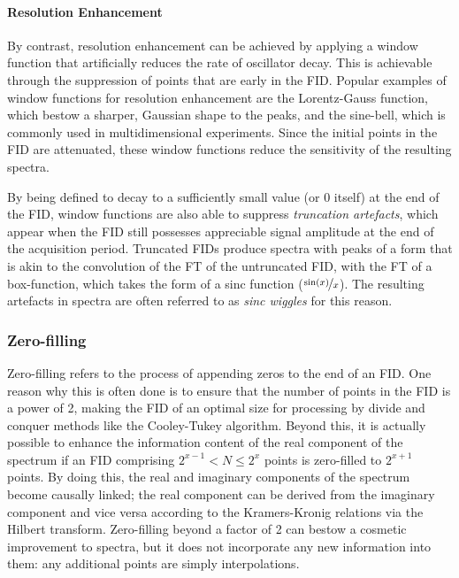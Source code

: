 \paragraph{Resolution Enhancement} By contrast, resolution enhancement can be
achieved by applying a window function that artificially reduces the rate of
oscillator decay. This is achievable through the suppression of points that are
early in the \ac{FID}. Popular
examples of window functions for resolution enhancement are the Lorentz-Gauss
function, which bestow a sharper, Gaussian shape to the peaks, and the
sine-bell, which is commonly used in multidimensional experiments. Since the
initial points in the \ac{FID} are attenuated, these window functions reduce the
sensitivity of the resulting spectra.

By being defined to decay to a sufficiently small value (or $0$ itself) at the
end of
the \ac{FID}, window functions are also able to suppress \emph{truncation
artefacts}, which appear when the \ac{FID} still possesses appreciable signal
amplitude at the end of the acquisition period. Truncated \acp{FID} produce
spectra with peaks of a form that is akin to the convolution of the \ac{FT} of
the untruncated \ac{FID}, with the \ac{FT} of a box-function, which takes the
form of a sinc function ($\nicefrac{\sin(x)}{x}$). The resulting artefacts in
spectra are often referred to as \emph{sinc wiggles} for this reason.

\subsubsection{Zero-filling}
Zero-filling refers to the process of appending zeros to the end of an
\ac{FID}. One reason why this is often done is to ensure that the number of
points in the \ac{FID} is a power of 2, making the \ac{FID} of an optimal size
for processing by divide and conquer methods like the Cooley-Tukey
algorithm\cite{Cooley1965}. Beyond this, it is actually
possible to enhance the information content of the real component of the
spectrum if an \ac{FID} comprising $2^{x-1} < N \leq 2^x$ points is zero-filled
to $2^{x+1}$ points\cite{Bartholdi1973}. By doing this, the real and imaginary
components of
the spectrum become causally linked; the real component can be derived from the
imaginary component and vice versa according to the Kramers-Kronig relations
via the Hilbert transform.
Zero-filling beyond a factor of 2 can bestow a
cosmetic improvement to spectra, but it does not incorporate any new
information into them: any additional points are simply interpolations.

